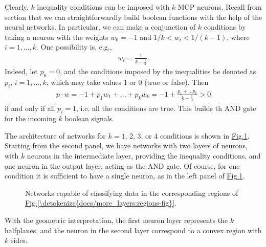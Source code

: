 \documentclass[letterpaper,10pt,english]{jupyterBook}
\let\sphinxpxdimen\pdfpxdimen\else\newdimen\sphinxpxdimen
\begin{document}
\sphinxAtStartPar
Clearly, \(k\) inequality conditions can be imposed with \(k\) MCP neurons.
Recall from section {\hyperref[\detokenize{docs/mcp:bool-sec}]{}} that we can straightforwardly build boolean functions with the help of the neural networks. In particular, we can make a conjunction of \(k\) conditions by taking a neuron with the weights \(w_0=-1\) and \(1/k < w_i < 1/(k-1)\), where \(i=1,\dots,k\). One possibility is, e.g.,
\begin{equation*}
\begin{split}w_i=\frac{1}{k-\frac{1}{2}}.\end{split}
\end{equation*}
\sphinxAtStartPar
Indeed, let \(p_0=0\), and the conditions imposed by the inequalities be denoted as \(p_i\), \(i=1,\dots,k\), which may take values 1 or 0 (true or false). Then
\begin{equation*}
\begin{split}p \cdot w =-1 + p_1 w_1 + \dots + p_k w_k = -1+\frac{p_1+\dots p_k}{k-\frac{1}{2}} > 0\end{split}
\end{equation*}
\sphinxAtStartPar
if and only if all \(p_i=1\), i.e. all the conditions are true. This builds th AND gate for the incoming \(k\) boolean signals.

\sphinxAtStartPar
The architecture of networks for \(k=1\), 2, 3, or 4 conditions is shown in \hyperref[\detokenize{docs/more_layers:nfn-fig}]{Fig.\@ \ref{\detokenize{docs/more_layers:nfn-fig}}}. Starting from the second panel, we have networks with two layers of neurons, with \(k\) neurons in the intermediate layer, providing the inequality conditions, and one neuron in the output layer, acting as the AND gate. Of course, for one condition it is sufficient to have a single neuron, as in the left panel of \hyperref[\detokenize{docs/more_layers:nfn-fig}]{Fig.\@ \ref{\detokenize{docs/more_layers:nfn-fig}}}.

\begin{figure}[htbp]
\centering
\capstart

\noindent\sphinxincludegraphics[width=820\sphinxpxdimen]{{nf1-4}.png}
\caption{Networks capable of classifying data in the corresponding regions of \hyperref[\detokenize{docs/more_layers:regions-fig}]{Fig.\@ \ref{\detokenize{docs/more_layers:regions-fig}}}.}\label{\detokenize{docs/more_layers:nfn-fig}}\end{figure}

\sphinxAtStartPar
With the geometric interpretation, the first neuron layer represents the \(k\) half\sphinxhyphen{}planes, and the neuron in the second layer correspond to a convex region with \(k\) sides.
\end{document}
